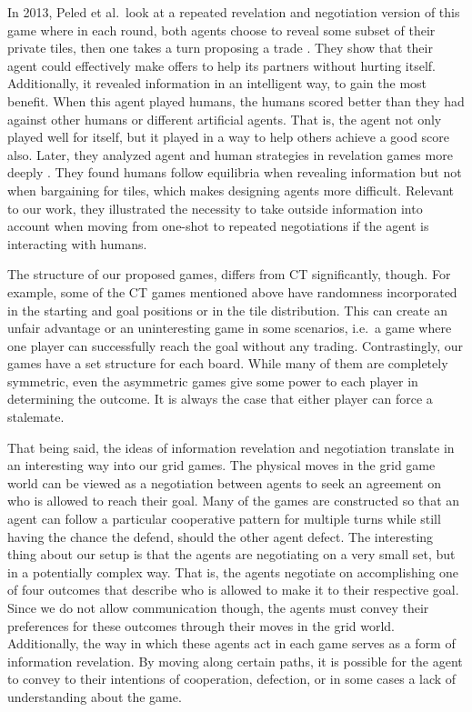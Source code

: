 \documentclass[12pt]{article}
\begin{document}
In 2013, Peled et al.\ look at a repeated revelation and negotiation version of this game where in each round, both agents choose to reveal some subset of their private tiles, then one takes a turn proposing a trade \cite{Peled:2013ug}. They show that their agent could effectively make offers to help its partners without hurting itself. Additionally, it revealed information in an intelligent way, to gain the most benefit. When this agent played humans, the humans scored better than they had against other humans or different artificial agents. That is, the agent not only played well for itself, but it played in a way to help others achieve a good score also. Later, they analyzed agent and human strategies in revelation games more deeply \cite{Peled:2015if}. They found humans follow equilibria when revealing information but not when bargaining for tiles, which makes designing agents more difficult. Relevant to our work, they illustrated the necessity to take outside information into account when moving from one-shot to repeated negotiations if the agent is interacting with humans.

The structure of our proposed games, differs from CT significantly, though. For example, some of the CT games mentioned above have randomness incorporated in the starting and goal positions or in the tile distribution. This can create an unfair advantage or an uninteresting game in some scenarios, i.e.\ a game where one player can successfully reach the goal without any trading. Contrastingly, our games have a set structure for each board. While many of them are completely symmetric, even the asymmetric games give some power to each player in determining the outcome. It is always the case that either player can force a stalemate. 

That being said, the ideas of information revelation and negotiation translate in an interesting way into our grid games. The physical moves in the grid game world can be viewed as a negotiation between agents to seek an agreement on who is allowed to reach their goal. Many of the games are constructed so that an agent can follow a particular cooperative pattern for multiple turns while still having the chance the defend, should the other agent defect. The interesting thing about our setup is that the agents are negotiating on a very small set, but in a potentially complex way. That is, the agents negotiate on accomplishing one of four outcomes that describe who is allowed to make it to their respective goal. Since we do not allow communication though, the agents must convey their preferences for these outcomes through their moves in the grid world. Additionally, the way in which these agents act in each game serves as a form of information revelation. By moving along certain paths, it is possible for the agent to convey to their intentions of cooperation, defection, or in some cases a lack of understanding about the game.


{}
\end{document}
